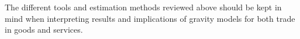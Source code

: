 The different tools and estimation methods reviewed above should be kept in mind when interpreting results and implications of gravity models for both trade in goods and services.










































































